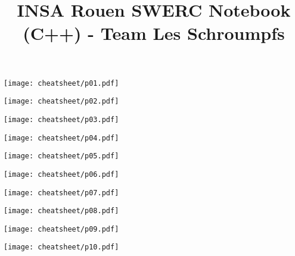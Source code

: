 \documentclass[10pt]{article}
\title{\vspace{-4ex}\Large{INSA Rouen SWERC Notebook (C++) - Team Les Schroumpfs}}
\author{}
\date{}
\begin{document}
\begin{landscape}
\begin{multicols}{2}

\maketitle
\vspace{-13ex}
\tableofcontents
\pagestyle{fancy}



\end{multicols}
\end{landscape}

\centerline{\texttt{[image: cheatsheet/p01.pdf]}}
\centerline{\texttt{[image: cheatsheet/p02.pdf]}}
\centerline{\texttt{[image: cheatsheet/p03.pdf]}}
\centerline{\texttt{[image: cheatsheet/p04.pdf]}}
\centerline{\texttt{[image: cheatsheet/p05.pdf]}}
\centerline{\texttt{[image: cheatsheet/p06.pdf]}}
\centerline{\texttt{[image: cheatsheet/p07.pdf]}}
\centerline{\texttt{[image: cheatsheet/p08.pdf]}}
\centerline{\texttt{[image: cheatsheet/p09.pdf]}}
\centerline{\texttt{[image: cheatsheet/p10.pdf]}}

\newpage
\null
\newpage
\null
\newpage
\null
\end{document}
